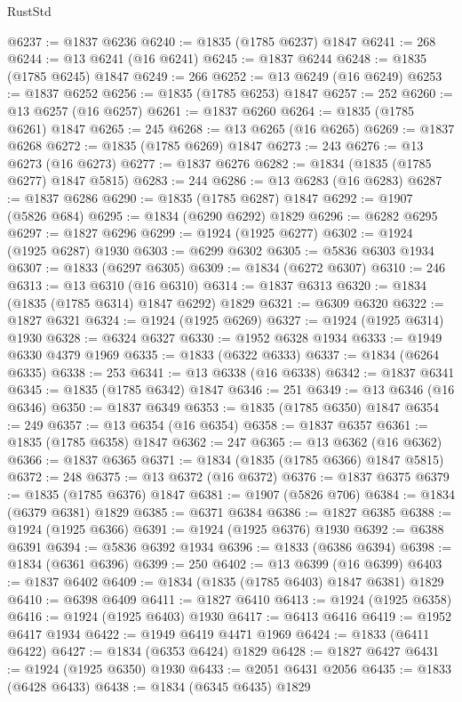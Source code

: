 \begin{lexlean}{RustStd}
\begin{coremodule}
{\begin{coremodule}
{{{{{@6237 := @1837 @6236
@6240 := @1835 (@1785 @6237) @1847
@6241 := 268
@6244 := @13 @6241 (@16 @6241)
@6245 := @1837 @6244
@6248 := @1835 (@1785 @6245) @1847
@6249 := 266
@6252 := @13 @6249 (@16 @6249)
@6253 := @1837 @6252
@6256 := @1835 (@1785 @6253) @1847
@6257 := 252
@6260 := @13 @6257 (@16 @6257)
@6261 := @1837 @6260
@6264 := @1835 (@1785 @6261) @1847
@6265 := 245
@6268 := @13 @6265 (@16 @6265)
@6269 := @1837 @6268
@6272 := @1835 (@1785 @6269) @1847
@6273 := 243
@6276 := @13 @6273 (@16 @6273)
@6277 := @1837 @6276
@6282 := @1834 (@1835 (@1785 @6277) @1847 @5815)
@6283 := 244
@6286 := @13 @6283 (@16 @6283)
@6287 := @1837 @6286
@6290 := @1835 (@1785 @6287) @1847
@6292 := @1907 (@5826 @684)
@6295 := @1834 (@6290 @6292) @1829
@6296 := @6282 @6295
@6297 := @1827 @6296
@6299 := @1924 (@1925 @6277)
@6302 := @1924 (@1925 @6287) @1930
@6303 := @6299 @6302
@6305 := @5836 @6303 @1934
@6307 := @1833 (@6297 @6305)
@6309 := @1834 (@6272 @6307)
@6310 := 246
@6313 := @13 @6310 (@16 @6310)
@6314 := @1837 @6313
@6320 := @1834 (@1835 (@1785 @6314) @1847 @6292) @1829
@6321 := @6309 @6320
@6322 := @1827 @6321
@6324 := @1924 (@1925 @6269)
@6327 := @1924 (@1925 @6314) @1930
@6328 := @6324 @6327
@6330 := @1952 @6328 @1934
@6333 := @1949 @6330 @4379 @1969
@6335 := @1833 (@6322 @6333)
@6337 := @1834 (@6264 @6335)
@6338 := 253
@6341 := @13 @6338 (@16 @6338)
@6342 := @1837 @6341
@6345 := @1835 (@1785 @6342) @1847
@6346 := 251
@6349 := @13 @6346 (@16 @6346)
@6350 := @1837 @6349
@6353 := @1835 (@1785 @6350) @1847
@6354 := 249
@6357 := @13 @6354 (@16 @6354)
@6358 := @1837 @6357
@6361 := @1835 (@1785 @6358) @1847
@6362 := 247
@6365 := @13 @6362 (@16 @6362)
@6366 := @1837 @6365
@6371 := @1834 (@1835 (@1785 @6366) @1847 @5815)
@6372 := 248
@6375 := @13 @6372 (@16 @6372)
@6376 := @1837 @6375
@6379 := @1835 (@1785 @6376) @1847
@6381 := @1907 (@5826 @706)
@6384 := @1834 (@6379 @6381) @1829
@6385 := @6371 @6384
@6386 := @1827 @6385
@6388 := @1924 (@1925 @6366)
@6391 := @1924 (@1925 @6376) @1930
@6392 := @6388 @6391
@6394 := @5836 @6392 @1934
@6396 := @1833 (@6386 @6394)
@6398 := @1834 (@6361 @6396)
@6399 := 250
@6402 := @13 @6399 (@16 @6399)
@6403 := @1837 @6402
@6409 := @1834 (@1835 (@1785 @6403) @1847 @6381) @1829
@6410 := @6398 @6409
@6411 := @1827 @6410
@6413 := @1924 (@1925 @6358)
@6416 := @1924 (@1925 @6403) @1930
@6417 := @6413 @6416
@6419 := @1952 @6417 @1934
@6422 := @1949 @6419 @4471 @1969
@6424 := @1833 (@6411 @6422)
@6427 := @1834 (@6353 @6424) @1829
@6428 := @1827 @6427
@6431 := @1924 (@1925 @6350) @1930
@6433 := @2051 @6431 @2056
@6435 := @1833 (@6428 @6433)
@6438 := @1834 (@6345 @6435) @1829
}}}}}
\end{coremodule}}
\end{coremodule}
\end{lexlean}
